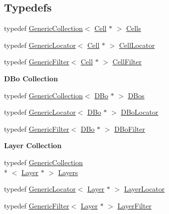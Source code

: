 \subsection*{Typedefs}
\begin{DoxyCompactItemize}
\item 
typedef \hyperlink{classHurricane_1_1GenericCollection}{Generic\-Collection}$<$ \hyperlink{classHurricane_1_1Cell}{Cell} $\ast$ $>$ \hyperlink{namespaceHurricane_a8b4ab14b26f36f43d83a50294410b44a}{Cells}
\item 
typedef \hyperlink{classHurricane_1_1GenericLocator}{Generic\-Locator}$<$ \hyperlink{classHurricane_1_1Cell}{Cell} $\ast$ $>$ \hyperlink{namespaceHurricane_abd99adab3b5944a4d1ace3d0b0b34f57}{Cell\-Locator}
\item 
typedef \hyperlink{classHurricane_1_1GenericFilter}{Generic\-Filter}$<$ \hyperlink{classHurricane_1_1Cell}{Cell} $\ast$ $>$ \hyperlink{namespaceHurricane_addb0e9cd376680ecea4966516694b799}{Cell\-Filter}
\end{DoxyCompactItemize}
\begin{Indent}{\bf D\-Bo Collection}\par
\begin{DoxyCompactItemize}
\item 
typedef \hyperlink{classHurricane_1_1GenericCollection}{Generic\-Collection}$<$ \hyperlink{classHurricane_1_1DBo}{D\-Bo} $\ast$ $>$ \hyperlink{namespaceHurricane_a0aa3882e095f9d425c253223d1c0793d}{D\-Bos}
\item 
typedef \hyperlink{classHurricane_1_1GenericLocator}{Generic\-Locator}$<$ \hyperlink{classHurricane_1_1DBo}{D\-Bo} $\ast$ $>$ \hyperlink{namespaceHurricane_a7d70ef7ad837859e453171feb692535c}{D\-Bo\-Locator}
\item 
typedef \hyperlink{classHurricane_1_1GenericFilter}{Generic\-Filter}$<$ \hyperlink{classHurricane_1_1DBo}{D\-Bo} $\ast$ $>$ \hyperlink{namespaceHurricane_a2af87173f0c45c5dc1f504d3ea2317d9}{D\-Bo\-Filter}
\end{DoxyCompactItemize}
\end{Indent}
\begin{Indent}{\bf Layer Collection}\par
\begin{DoxyCompactItemize}
\item 
typedef \hyperlink{classHurricane_1_1GenericCollection}{Generic\-Collection}\\*
$<$ \hyperlink{classHurricane_1_1Layer}{Layer} $\ast$ $>$ \hyperlink{namespaceHurricane_a7b7200a36ab7ce8a157ddbe78b625f38}{Layers}
\item 
typedef \hyperlink{classHurricane_1_1GenericLocator}{Generic\-Locator}$<$ \hyperlink{classHurricane_1_1Layer}{Layer} $\ast$ $>$ \hyperlink{namespaceHurricane_a91a93ea29be3e6658d72f9bee0da8c7b}{Layer\-Locator}
\item 
typedef \hyperlink{classHurricane_1_1GenericFilter}{Generic\-Filter}$<$ \hyperlink{classHurricane_1_1Layer}{Layer} $\ast$ $>$ \hyperlink{namespaceHurricane_a150e0e72c5c5609e0feb3311fa5bc127}{Layer\-Filter}
\end{DoxyCompactItemize}
\end{Indent}

